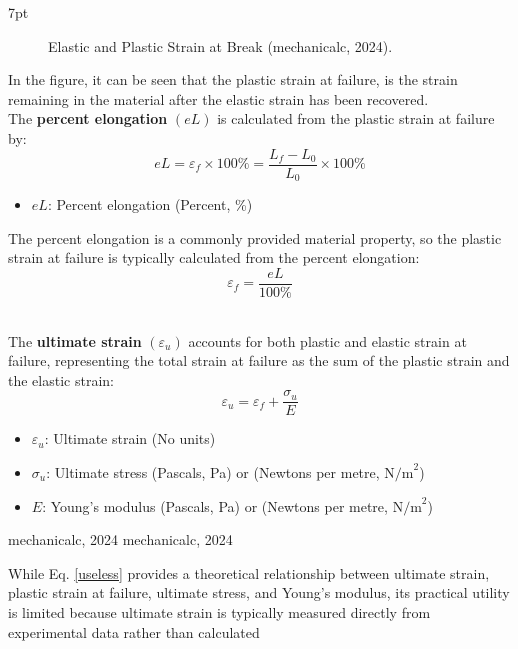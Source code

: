 \documentclass{article}
\newcommand{\formalsource}{} %
\newenvironment{formal}[1][]{%
    \renewcommand{\formalsource}{#1}%
    \def\FrameCommand{%
        \hspace{1pt}%
        {\color{gray}\vrule width 2pt}%
        {\color{white}\vrule width 4pt}%
        \colorbox{white}%
    }%
    \MakeFramed{\advance\hsize-\width\FrameRestore}%
    \noindent\hspace{-4.55pt}%
    \begin{adjustwidth}{}{7pt}%
        \vspace{2pt}%
    }%
    {%
        \vspace{4pt}%
        \ifx\formalsource\empty %
        \else
        \hfill{\footnotesize{\formalsource}}%
        \fi
    \end{adjustwidth}\endMakeFramed%
}
\begin{document}
{\begin{formal}[mechanicalc, 2024]
\begin{minipage}{0.45\textwidth}
\begin{figure}[H]
    \caption{Elastic and Plastic Strain at Break (mechanicalc, 2024).}
    \label{fig:strain-break}
\end{figure}
\end{minipage}\hfill
\begin{minipage}{0.49\textwidth}
In the figure, it can be seen that the plastic strain at failure, is the strain remaining in the material after the elastic strain has been recovered.\\[8pt]
The \textbf{percent elongation} \((eL)\) is calculated from the plastic strain at failure by:
\begin{equation}
    eL = \varepsilon_f \times 100\% = \frac{L_f - L_0}{L_0} \times 100\%
    \label{el}
\end{equation}
\begin{itemize}[itemsep=-1mm]
    \item $eL$: Percent elongation (Percent, \%)
\end{itemize}
The percent elongation is a commonly provided material property, so the plastic strain at failure is typically calculated from the percent elongation:
\begin{equation}
    \varepsilon_f = \frac{eL}{100\%}
\end{equation}
\end{minipage}\\[8pt]
The \textbf{ultimate strain} $(\varepsilon_u)$ accounts for both plastic and elastic strain at failure, representing the total strain at failure as the sum of the plastic strain and the elastic strain:
\begin{equation}
    \varepsilon_u = \varepsilon_f + \frac{\sigma_{u}}{E}
    \label{useless}
\end{equation}
\begin{itemize}[itemsep=-1mm]
    \item $\varepsilon_u$: Ultimate strain (No units)
    \item $\sigma_{u}$: Ultimate stress (Pascals, Pa) or (Newtons per metre, \(\text{N/m}^2\))
    \item $E$: Young's modulus (Pascals, Pa) or (Newtons per metre, \(\text{N/m}^2\))
\end{itemize} 
\end{formal}
\newpage
While Eq. \ref{useless} provides a theoretical relationship between ultimate strain, plastic strain at failure, ultimate stress, and Young's modulus, its practical utility is limited because ultimate strain is typically measured directly from experimental data rather than calculated\\[8pt]
}
\end{document}
